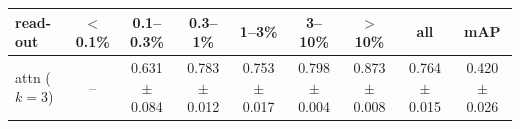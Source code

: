 \begin{tabular}{lcccccccc}
\toprule
read-out & $<$0.1\% & 0.1--0.3\% & 0.3--1\% & 1--3\% & 3--10\% & $>$10\% & all & mAP \\
\midrule
attn ($k=3$) & -- & 0.631 $\pm$ 0.084 & 0.783 $\pm$ 0.012 & 0.753 $\pm$ 0.017 & 0.798 $\pm$ 0.004 & 0.873 $\pm$ 0.008 & 0.764 $\pm$ 0.015 & 0.420 $\pm$ 0.026 \\
\bottomrule
\end{tabular}
